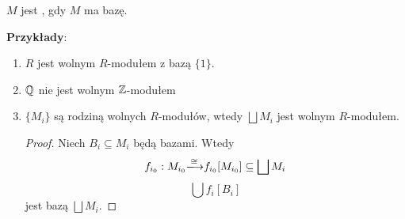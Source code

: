 \begin{definition}
  $M$ jest , gdy $M$ ma bazę.
\end{definition}

\textbf{Przykłady}:

\begin{enumerate}
    \item $R$ jest wolnym $R$-modułem z bazą $\{1\}$. 
    \item $\mathbb{Q}$ nie jest wolnym $\mathbb{Z}$-modułem
    \item $\{M_i\}$ są rodziną wolnych $R$-modułów, wtedy $\bigsqcup M_i$ jest wolnym $R$-modułem.

      \begin{proof}
        Niech $B_i\subseteq M_i$ będą bazami. Wtedy 
        $$f_{i_0}:M_{i_0}\isomorphism f_{i_0}[M_{i_0}]\subseteq\bigsqcup M_i$$
        $$\bigcup f_i[B_i]$$
        jest bazą $\bigsqcup M_i$.
      \end{proof}
\end{enumerate}


